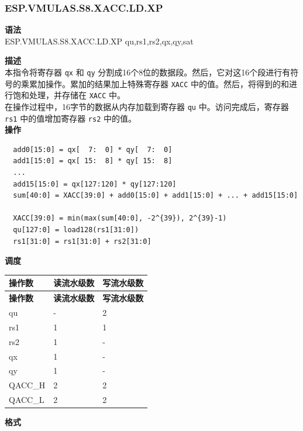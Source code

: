 \newpage

\newpage
\subsubsection{ESP.VMULAS.S8.XACC.LD.XP}\label{instruction:ESPVMULASS8XACCLDXP}
\textbf{语法}\\
ESP.VMULAS.S8.XACC.LD.XP qu,rs1,rs2,qx,qy,sat

\textbf{描述}\\

本指令将寄存器 \lstinline{qx} 和 \lstinline{qy} 分割成16个8位的数据段。然后，它对这16个段进行有符号的乘累加操作。累加的结果加上特殊寄存器 \lstinline{XACC} 中的值。然后，将得到的和进行饱和处理，并存储在 \lstinline{XACC} 中。\\ 在操作过程中，16字节的数据从内存加载到寄存器 \lstinline{qu} 中。访问完成后，寄存器 \lstinline{rs1} 中的值增加寄存器 \lstinline{rs2} 中的值。\\
\textbf{操作}
\begin{lstlisting}
  add0[15:0] = qx[  7:  0] * qy[  7:  0]
  add1[15:0] = qx[ 15:  8] * qy[ 15:  8]
  ...
  add15[15:0] = qx[127:120] * qy[127:120]
  sum[40:0] = XACC[39:0] + add0[15:0] + add1[15:0] + ... + add15[15:0]

  XACC[39:0] = min(max(sum[40:0], -2^{39}), 2^{39}-1)
  qu[127:0] = load128(rs1[31:0])
  rs1[31:0] = rs1[31:0] + rs2[31:0]
\end{lstlisting}

\textbf{调度}\\
\begin{longtable}[c]{|l|l|l|}
    \hline
    \rowcolor{lightgray}
    \textbf{操作数} & \textbf{读流水级数} & \textbf{写流水级数} \\\hline
    \endfirsthead
    \hline
    \rowcolor{lightgray}
     \textbf{操作数} & \textbf{读流水级数} & \textbf{写流水级数} \\\hline
    \endhead
    \hline
    \endfoot

    qu & - & 2 \\\hline
    rs1 & 1 & 1 \\\hline
    rs2 & 1 & - \\\hline
     qx & 1 & - \\\hline
     qy & 1 & - \\\hline
     QACC\_H & 2 & 2 \\\hline
     QACC\_L & 2 & 2

\end{longtable}

\textbf{格式}\\

